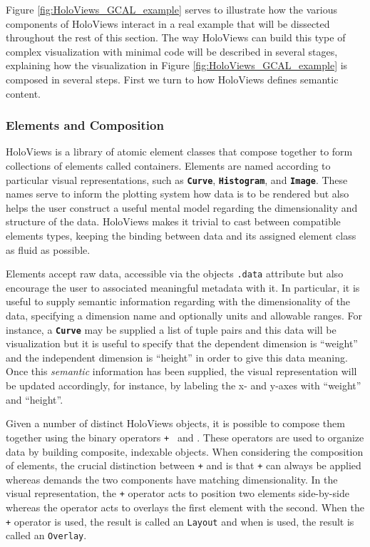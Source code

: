 \documentclass[phd,ianc,twoside]{infthesis}
\newcommand{\tbf}[1]{\texttt{\textbf{#1}}}
\begin{document}
Figure \ref{fig:HoloViews_GCAL_example} serves to illustrate how the
various components of HoloViews interact in a real example that will be
dissected throughout the rest of this section. The way HoloViews can
build this type of complex visualization with minimal code will be
described in several stages, explaining how the visualization in Figure
\ref{fig:HoloViews_GCAL_example} is composed in several steps. First we
turn to how HoloViews defines semantic content.


\subsubsection*{Elements and Composition}

HoloViews is a library of atomic element classes that compose together
to form collections of elements called containers. Elements are named
according to particular visual representations, such as \tbf{Curve},
\tbf{Histogram}, and \tbf{Image}. These names serve to inform the
plotting system how data is to be rendered but also helps the user
construct a useful mental model regarding the dimensionality and
structure of the data. HoloViews makes it trivial to cast between
compatible elements types, keeping the binding between data and its
assigned element class as fluid as possible.

Elements accept raw data, accessible via the objects {\tt .data}
attribute but also encourage the user to associated meaningful metadata
with it. In particular, it is useful to supply semantic information
regarding with the dimensionality of the data, specifying a dimension
name and optionally units and allowable ranges. For instance, a
\tbf{Curve} may be supplied a list of tuple pairs and this data will be
visualization but it is useful to specify that the dependent dimension
is ``weight'' and the independent dimension is ``height'' in order to give
this data meaning. Once this \emph{semantic} information has been
supplied, the visual representation will be updated accordingly, for
instance, by labeling the x- and y-axes with ``weight'' and ``height''.

Given a number of distinct HoloViews objects, it is possible to compose
them together using the binary operators {\tt + } and {\tt *}. These
operators are used to organize data by building composite, indexable
objects. When considering the composition of elements, the crucial
distinction between {\tt +} and {\tt *} is that {\tt +} can always be
applied whereas {\tt *} demands the two components have matching
dimensionality. In the visual representation, the {\tt +} operator acts
to position two elements side-by-side whereas the {\tt *} operator acts
to overlays the first element with the second. When the {\tt +} operator
is used, the result is called an {\tt Layout} and when {\tt *} is used,
the result is called an {\tt Overlay}.
\end{document}

